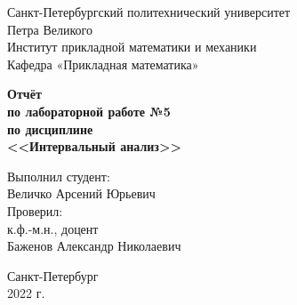 \thispagestyle{empty}

\begin{center}
\large
Санкт-Петербургский политехнический университет\\
Петра Великого\\
Институт прикладной математики и механики\\
Кафедра «Прикладная математика»\\
\end{center}

\vspace{8em}

\begin{center}
\bfseries
Отчёт\\
по лабораторной работе №5\\
по дисциплине\\
<<Интервальный анализ>>\\
\end{center}

\vspace{8em}

\begin{flushright}
Выполнил студент:\\
Величко Арсений Юрьевич\\
\vspace{2em}
Проверил:\\
к.ф.-м.н., доцент\\
Баженов Александр Николаевич\\
\end{flushright}

\vfill

\begin{center}
Санкт-Петербург\\
2022 г.\\
\end{center}
\newpage